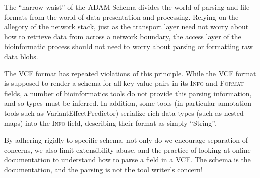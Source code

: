 \documentclass[10pt,twocolumn]{article}
\theoremstyle{plain}
\begin{document}
The ``narrow waist'' of the ADAM Schema divides the world of parsing and file formats from the world of data presentation and processing.
Relying on the allegory of the network stack, just as the transport layer need not worry about how to retrieve data from across a network
boundary, the access layer of the bioinformatic process should not need to worry about parsing or formatting raw data blobs. 

The VCF format
has repeated violations of this principle. While the VCF format is supposed to render a schema for all key value pairs in its \textsc{Info}
and \textsc{Format} fields, a number of bioinformatics tools do not provide this parsing information, and so types must be inferred. In addition,
some tools (in particular annotation tools such as VariantEffectPredictor\cite{vep}) serialize rich data types (such as nested maps) into the
\textsc{Info} field, describing their format as simply ``String''. 

By adhering rigidly to specific schema, not only do we encourage separation of
concerns, we also limit extensibility abuse, and the practice of looking at online documentation to understand how to parse a field in a VCF.
The schema is the documentation, and the parsing is not the tool writer's concern!
\end{document}
